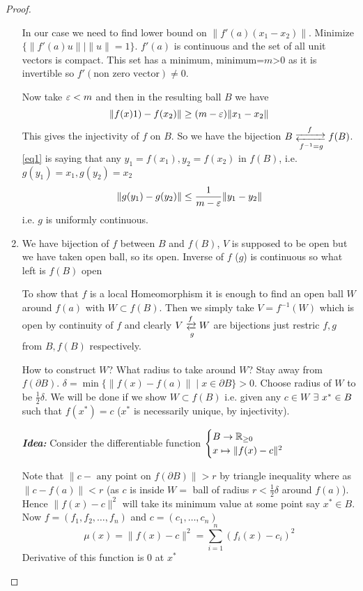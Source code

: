 \begin{proof}
\begin{enumerate}[label=\bfseries\tiny\protect\circled{\small\arabic*}]
In our case we need to find lower bound on $\|f'(a)(x_1-x_2)\|$. Minimize $\{\|f'(a)u\|\mid \|u\|=1\}$. $f'(a)$ is continuous and the set of all unit vectors is compact. This set has a minimum, minimum=$m$>0 as it is invertible so $f'(\text{non zero vector})\neq 0$. 

Now take $\varepsilon<m$ and then in the resulting ball $B$ we have \begin{equation}
	\|f(x)1)-f(x_2)\|\geq (m-\varepsilon)\|x_1-x_2\|\label{eq1}
\end{equation}This gives the injectivity of $f$ on $B$. So we have the bijection $B\mathrel{\raisebox{2pt}{$\xrightarrow{\ \ \  f\ \ \ }$}
\llap{\raisebox{-2pt}{$\xleftarrow[f^{-1}=g]{}$}}}f(B)$. \eqref{eq1} is saying that any $y_1=f(x_1), y_2=f(x_2)$ in $f(B)$, i.e. $g(y_1)=x_1,g(y_2)=x_2$ $$\|g(y_1)-g(y_2)\|\leq \frac{1}{m-\varepsilon}\|y_1-y_2\|$$ i.e. $g$ is uniformly continuous.

\item We have bijection of $f$ between $B$ and $f(B)$, $V$ is supposed to be open but we have taken open ball, so its open. Inverse of $f$ ($g$) is continuous so what left is $f(B)$ open\parinn

To show that $f$ is a local Homeomorphism it is enough to find an open ball $W$ around $f(a)$ with $W\subset f(B)$. Then we simply take $V=f^{-1}(W)$ which is open by continuity of $f$ and clearly $V\mathrel{\raisebox{2pt}{$\xrightarrow{f}$}
	\llap{\raisebox{-2pt}{$\xleftarrow[g]{}$}}}W$ are bijections just restric $f,g$ from $B,f(B)$ respectively.

How to construct $W$? What radius to take around $W$? Stay away from $f(\partial B)$. $\delta=\min\{ \|f(x)-f(a)\| \mid x\in \partial B  \}>0$. Choose radius of $W$ to be $\frac12\delta$. We will be done if we show $W\subset f(B)$ i.e. given any $c\in W$ $\exists\ x^*\in B$ such that $f(x^*)=c$ ($x^*$ is necessarily unique, by injectivity).\parinf

\textbf{\textit{Idea: }}Consider the differentiable function $\begin{cases}
	B\to \mathbb{R}_{\geq 0}\\ x\mapsto \|f(x)-c\|^2
\end{cases}$\parinn


Note that $\|c-\text{ any point on }f(\partial B)\|>r$ by triangle inequality where as $\|c-f(a)\|<r$ (as $c$ is inside $W=$ ball of radius $r<\frac12\delta$ around $f(a)$). Hence $\|f(x)-c\|^2$ will take its minimum value at some point say $x^*\in B$. Now $f=(f_1,f_2,\dots,f_n)$ and $c=(c_1,\dots,c_n)$ $$\mu(x)=\|f(x)-c\|^2=\sum_{i=1}^n (f_i(x)-c_i)^2$$Derivative of this function is $0$ at $x^*$


\end{enumerate}
\end{proof}
